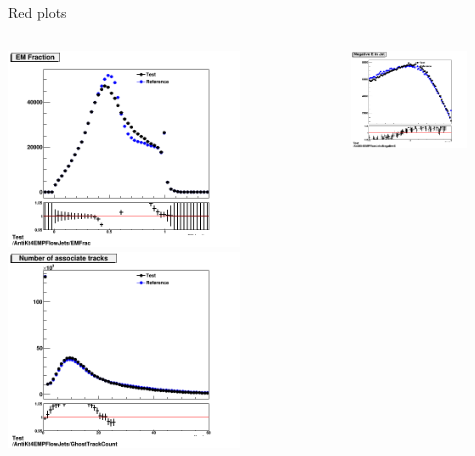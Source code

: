 \begin{frame}{Red plots}
    \begin{columns}
        \begin{column}{0.5\textwidth}
            \centering \includegraphics[width=0.72\textwidth]{FEEM}
            \centering \includegraphics[width=0.72\textwidth]{FEtracks}
        \end{column}
        \begin{column}{0.5\textwidth}
            \centering \includegraphics[width=0.72\textwidth]{FEnegE}

\end{column}
\end{columns}
\end{frame}

